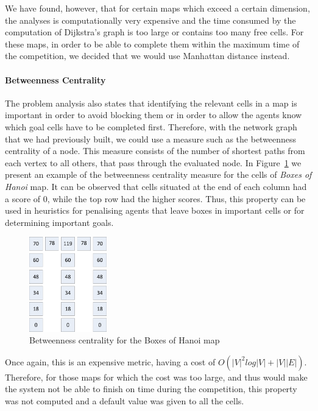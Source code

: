 We have found, however, that for certain maps which exceed a certain dimension, the analyses is
computationally very expensive and the time consumed by the computation of Dijkstra's graph is too large or
contains too many free cells. For these maps, in order to be able to complete them within the maximum time of
the competition, we decided that we would use Manhattan distance instead.

\paragraph{Betweenness Centrality}

The problem analysis also states that identifying the relevant cells in a map is important in order to avoid
blocking them or in order to allow the agents know which goal cells have to be completed first. Therefore,
with the network graph that we had previously built, we could use a measure such as the betweenness centrality
of a node. This measure consists of the number of shortest paths from each vertex to all others, that pass
through the evaluated node. In Figure~\ref{fig:hanoi} we present an example of the betweenness centrality
measure for the cells of \textit{Boxes of Hanoi} map. It can be observed that cells situated at the end of
each column had a score of 0, while the top row had the higher scores. Thus, this property can be used in
heuristics for penalising agents that leave boxes in important cells or for determining important goals.

\begin{figure}[htb]
\begin{center}
 \includegraphics[width=0.3\textwidth]{figures/hanoi.png}
 \caption{Betweenness centrality for the Boxes of Hanoi map}
 \label{fig:hanoi}
\end{center}
\end{figure}

Once again, this is an expensive metric, having a cost of $O(|V|^2log|V| + |V||E|)$. Therefore, for those maps
for which the cost was too large, and thus would make the system not be able to finish on time during the
competition, this property was not computed and a default value was given to all the cells.

